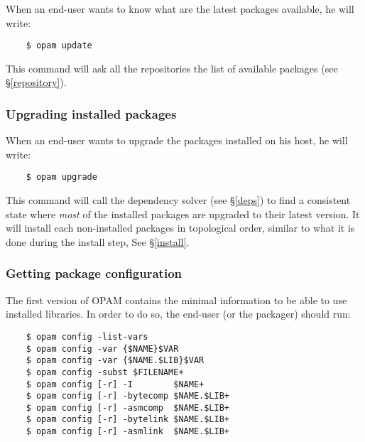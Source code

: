 \documentclass[a4paper,11pt]{article}
\begin{document}
When an end-user wants to know what are the latest packages available,
he will write:

\begin{verbatim}
    $ opam update
\end{verbatim}

This command will ask all the repositories the list of available
packages (see \S\ref{repository}).

\subsubsection{Upgrading installed packages}

When an end-user wants to upgrade the packages installed on his host,
he will write:

\begin{verbatim}
    $ opam upgrade
\end{verbatim}

This command will call the dependency solver (see \S\ref{deps}) to
find a consistent state where {\em most} of the installed packages are
upgraded to their latest version. It will install each non-installed
packages in topological order, similar to what it is done during the
install step, See \S\ref{install}.

\subsubsection{Getting package configuration}
\label{opam-config}

The first version of OPAM contains the minimal information to be able
to use installed libraries. In order to do so, the end-user (or the
packager) should run:

\begin{verbatim}
    $ opam config -list-vars
    $ opam config -var {$NAME}$VAR
    $ opam config -var {$NAME.$LIB}$VAR
    $ opam config -subst $FILENAME+
    $ opam config [-r] -I        $NAME+
    $ opam config [-r] -bytecomp $NAME.$LIB+
    $ opam config [-r] -asmcomp  $NAME.$LIB+
    $ opam config [-r] -bytelink $NAME.$LIB+
    $ opam config [-r] -asmlink  $NAME.$LIB+
\end{verbatim}
\end{document}
